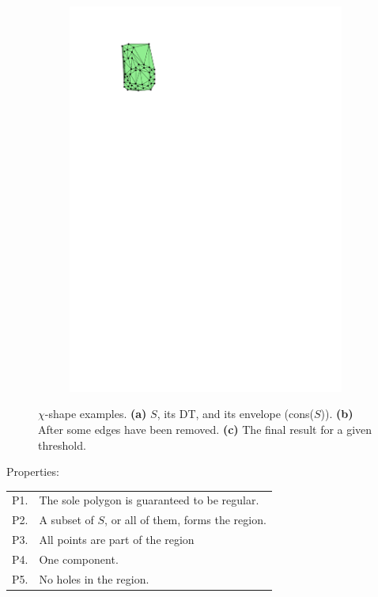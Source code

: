 \begin{figure}
\begin{subfigure}[b]{0.3\linewidth}
    \includegraphics[page=3,width=\textwidth]{figs/chishape.pdf}
    \caption{}
  \end{subfigure}
\caption{$\chi$-shape examples. \textbf{(a)} $S$, its DT, and its envelope (cons($S$)). \textbf{(b)} After some edges have been removed. \textbf{(c)} The final result for a given threshold.}
\label{fig:chishape}
\end{figure}

%

Properties:
\\
\begin{tabular}{@{}ll@{}}
\toprule
P1. & The sole polygon is guaranteed to be regular.  \\  
P2. & A subset of $S$, or all of them, forms the region. \\ 
P3. & All points are part of the region \\ 
P4. & One component.  \\ 
P5. & No holes in the region.  \\  
\bottomrule
\end{tabular}


